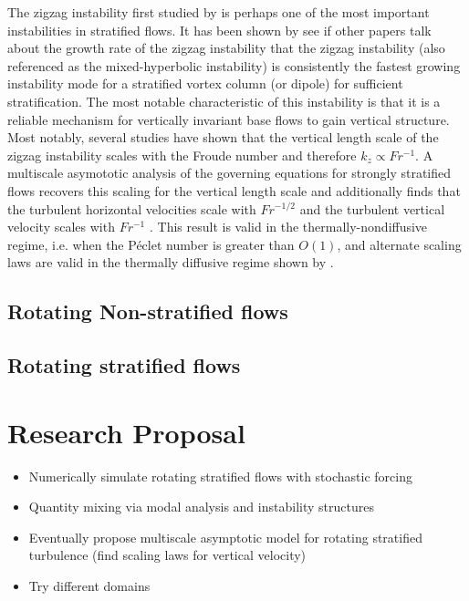 \documentclass[lineno]{jfm}
\begin{document}
The zigzag instability first studied by
\citet{BillantChomaz2000a,BillantChomaz2000b,BillantChomaz2000c,
BillantChomaz2001} is perhaps one of the most important instabilities in
stratified flows. It has been shown by
\citet{BillantChomaz2000c,Hattori_Suzuki_Hirota_Khandelwal_2021,Guo_Taylor_Zhou_2024} {\red see if
other papers talk about the growth rate of the zigzag instability} that the
zigzag instability (also referenced as the mixed-hyperbolic instability) is
consistently the fastest growing instability mode for a stratified vortex column
(or dipole) for sufficient stratification. The most notable characteristic of
this instability is that it is a reliable mechanism for vertically invariant base flows
to gain vertical structure. Most notably, several studies have shown that the
vertical length scale of the zigzag instability scales with the Froude number and
therefore $k_z \propto Fr^{-1}$. A multiscale asymototic analysis of the
governing equations for strongly stratified flows recovers this scaling for the
vertical length scale and additionally finds that the turbulent horizontal
velocities scale with $Fr^{-1/2}$ and the turbulent vertical velocity scales with
$Fr^{-1}$ \citep{Chinial2022}. This result is valid in the
thermally-nondiffusive regime, i.e. when the P\'eclet number is greater than
$O(1)$, and alternate scaling laws are valid in the thermally diffusive regime
shown by \citet{Shah2023}. 

\subsection{Rotating Non-stratified flows}

\subsection{Rotating stratified flows}



\section{Research Proposal}
\label{sec:researchproposal}

    \begin{itemize}
        \item Numerically simulate rotating stratified flows with stochastic
        forcing
        \item Quantity mixing via modal analysis and instability structures
        \item Eventually propose multiscale asymptotic model for rotating
        stratified turbulence (find scaling laws for vertical velocity)
        \item Try different domains
    \end{itemize}



\end{document}
